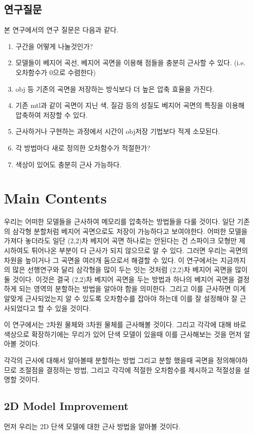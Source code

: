 \documentclass{gshs_thesis}
\theoremstyle{theorem}
\theoremstyle{lemma}
\theoremstyle{definition}
\begin{document}
\subsection{연구질문}
본 연구에서의 연구 질문은 다음과 같다. 
\begin{enumerate}
	\item 구간을 어떻게 나눌것인가?
	\item 모델들이 베지어 곡선, 베지어 곡면을 이용해 점들을 충분히 근사할 수 있다. (i.e. 오차함수가 0으로 수렴한다)
	\item obj 등 기존의 곡면을 저장하는 방식보다 더 높은 압축 효율을 가진다.
	\item 기존 mtl과 같이 곡면이 지닌 색, 질감 등의 성질도 베지어 곡면의 특징을 이용해 압축하여 저장할 수 있다.
	\item 근사하거나 구현하는 과정에서 시간이 obj저장 기법보다 적게 소모된다.
	\item 각 방법마다 새로 정의한 오차함수가 적절한가?
	\item 색상이 있어도 충분히 근사 가능하다. 
\end{enumerate}
\section{Main Contents}
우리는 어떠한 모델들을 근사하여 메모리를 압축하는 방법들을 다룰 것이다. 일단 기존의 삼각형 분할처럼 베지어 곡면으로도 저장이 가능하다고 보여야한다. 어떠한 모델을 가져다 놓더라도 일단 (2,2)차 베지어 곡면 하나로는 안된다는 건 스파이크 모형만 제시하여도 튀어나온 부분이 다 근사가 되지 않으므로 알 수 있다. 그러면 우리는 곡면의 차원을 높이거나 그 곡면을 여러개 둠으로서 해결할 수 있다. 이 연구에서는 지금까지의 많은 선행연구와 달리 삼각형을 많이 두는 잇는 것처럼 (2,2)차 베지어 곡면을 많이 둘 것이다. 이것은 결국 (2,2)차 베지어 곡면을 두는 방법과 하나의 베지어 곡면을 결정하게 되는 영역의 분할하는 방법을 알아야 함을 의미한다. 그리고 이를 근사하면 이게 알맞게 근사되었는지 알 수 있도록 오차함수를 잡아야 하는데 이를 잘 설정해야 잘 근사되었다고 할 수 있을 것이다. 

이 연구에서는 2차원 물체와 3차원 물체를 근사해볼 것이다. 그리고 각각에 대해 바로 색상으로 확장하기에는 무리가 있어 단색 모델이 있을때 이를 근사해보는 것을 먼저 알아볼 것이다. 

각각의 근사에 대해서 알아볼때 분할하는 방법 그리고 분할 했을때 곡면을 정의해야하므로 조절점을 결정하는 방법, 그리고 각각에 적절한 오차함수를 제시하고 적절성을 설명할 것이다. 
\subsection{2D Model Improvement}
먼저 우리는 2D 단색 모델에 대한 근사 방법을 알아볼 것이다. 
\end{document}

